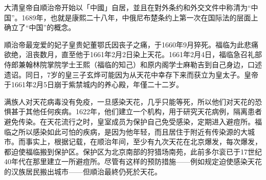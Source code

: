 大清皇帝自順治帝开始以「中國」自居，並且在對外条约和外交文件中称清为“中国”。1689年，也就是康熙二十八年，中俄尼布楚条约上第一次在国际法的层面上确立了“中国”的概念。

順治帝最宠爱的妃子皇贵妃董鄂氏因丧子之痛，于1660年9月猝死。福临为此悲痛欲绝，沮丧数月，直至他于1661年2月2日染上天花。1661年2月4日，福临急召礼部侍郎兼翰林院掌院学士王熙（福临的知己）和原内阁学士麻勒吉到自己身边，口述遗诏。同日，7岁的皇三子玄烨可能因为从天花中幸存下来而获立为皇太子。皇帝于1661年2月5日崩于紫禁城内的养心殿，年僅二十二岁。

满族人对天花病毒没有免疫，一旦感染天花，几乎只能等死，所以他们对天花的恐惧甚于其他任何疾病。1622年，他们建立一个机构，用于研究天花病例，隔离患者避免传染。在天花流行之时，皇室成员为保护自己免受感染，定期进入避痘所。福临之所以感染如此可怕的疾病，是因为他年轻，而且居住于附近有传染源的大城市。而事实上，根据记载，在顺治年间，至少有九次天花在北京爆发，每次爆发，都迫使福临搬到保护区。保护区为北京南部的狩猎场南苑，此前多尔衮已于17世纪40年代在那里建立一所避痘所。尽管有这样的预防措施——例如规定迫使感染天花的汉族居民搬出城市——但順治最終仍死於天花。

